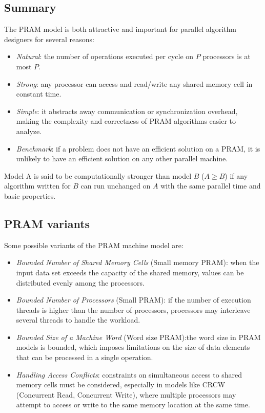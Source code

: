 \subsection{Summary}
The PRAM model is both attractive and important for parallel algorithm designers for several reasons:
\begin{itemize}
    \item \textit{Natural}: the number of operations executed per cycle on $P$ processors is at most $P$.
    \item \textit{Strong}: any processor can access and read/write any shared memory cell in constant time.
    \item \textit{Simple}: it abstracts away communication or synchronization overhead, making the complexity and correctness of PRAM algorithms easier to analyze.
    \item \textit{Benchmark}: if a problem does not have an efficient solution on a PRAM, it is unlikely to have an efficient solution on any other parallel machine.
\end{itemize}

\begin{definition}
    Model A is said to be computationally stronger than model $B$ ($A \geq B$) if any algorithm written for $B$ can run unchanged on $A$ with the same parallel time and basic properties.
\end{definition}

\subsection{PRAM variants}
Some possible variants of the PRAM machine model are: 
\begin{itemize}
    \item \textit{Bounded Number of Shared Memory Cells} (Small memory PRAM): when the input data set exceeds the capacity of the shared memory, values can be distributed evenly among the processors.
    \item \textit{Bounded Number of Processors} (Small PRAM): if the number of execution threads is higher than the number of processors, processors may interleave several threads to handle the workload.
    \item \textit{Bounded Size of a Machine Word} (Word size PRAM):the word size in PRAM models is bounded, which imposes limitations on the size of data elements that can be processed in a single operation.
    \item \textit{Handling Access Conflicts}: constraints on simultaneous access to shared memory cells must be considered, especially in models like CRCW (Concurrent Read, Concurrent Write), where multiple processors may attempt to access or write to the same memory location at the same time.
\end{itemize}